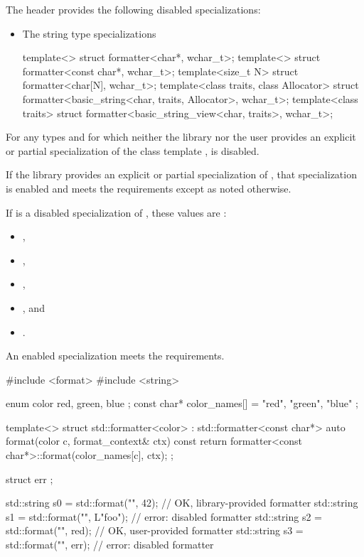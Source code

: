 \pnum
The header  provides
the following disabled specializations:
\begin{itemize}
\item
The string type specializations
\begin{codeblock}
template<> struct formatter<char*, wchar_t>;
template<> struct formatter<const char*, wchar_t>;
template<size_t N> struct formatter<char[N], wchar_t>;
template<class traits, class Allocator>
  struct formatter<basic_string<char, traits, Allocator>, wchar_t>;
template<class traits>
  struct formatter<basic_string_view<char, traits>, wchar_t>;
\end{codeblock}
\end{itemize}

\pnum
For any types  and  for which
neither the library nor the user provides
an explicit or partial specialization of
the class template ,
 is disabled.

\pnum
If the library provides an explicit or partial specialization of
, that specialization is enabled
and meets the  requirements
except as noted otherwise.

\pnum
If  is a disabled specialization of , these
values are :
\begin{itemize}
\item {},
\item {},
\item {},
\item {}, and
\item {}.
\end{itemize}

\pnum
An enabled specialization  meets the
 requirements.
\begin{example}
\begin{codeblock}
#include <format>
#include <string>

enum color { red, green, blue };
const char* color_names[] = { "red", "green", "blue" };

template<> struct std::formatter<color> : std::formatter<const char*> {
  auto format(color c, format_context& ctx) const {
    return formatter<const char*>::format(color_names[c], ctx);
  }
};

struct err {};

std::string s0 = std::format("{}", 42);         // OK, library-provided formatter
std::string s1 = std::format("{}", L"foo");     // error: disabled formatter
std::string s2 = std::format("{}", red);        // OK, user-provided formatter
std::string s3 = std::format("{}", err{});      // error: disabled formatter
\end{codeblock}
\end{example}

